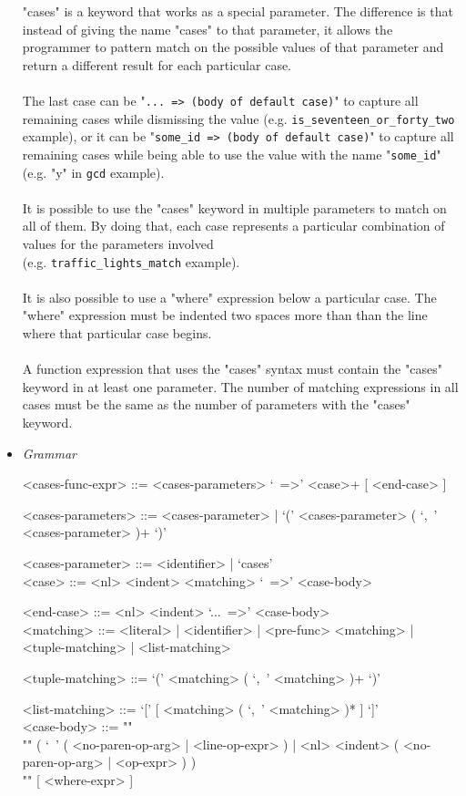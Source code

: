 \documentclass{article}
\begin{document}
\begin{itemize}
"cases" is a keyword that works as a special parameter. The difference is that
instead of giving the name "cases" to that parameter, it allows the programmer
to pattern match on the possible values of that parameter and return a
different result for each particular case. 
\\\\
The last case can be "\texttt{... => (body of default case)}" to capture all
remaining cases while dismissing the value (e.g.
\texttt{is_seventeen_or_forty_two} example), or it can be
"\texttt{some_id => (body of default case)}" to capture all remaining
cases while being able to use the value with the name "\texttt{some_id}"
(e.g.  "y" in \texttt{gcd} example).
\\\\
It is possible to use the "cases" keyword in multiple parameters to match on all
of them. By doing that, each case represents a particular combination of values
for the parameters involved\\(e.g. \texttt{traffic_lights_match} example).
\\\\
It is also possible to use a "where" expression below a particular case. The
"where" expression must be indented two spaces more than than the line where
that particular case begins.
\\\\
A function expression that uses the "cases" syntax must contain the "cases"
keyword in at least one parameter. The number of matching expressions in 
all cases must be the same as the number of parameters with the "cases" keyword.

\item \textit{Grammar}
\begin{grammar}
<cases-func-expr> ::= <cases-parameters> `\ =>' <case>+ [ <end-case> ]

<cases-parameters> ::=
<cases-parameter> | `(' <cases-parameter> ( `,\ ' <cases-parameter> )+ `)'

<cases-parameter> ::= <identifier> | `cases' \\

<case> ::=  <nl> <indent> <matching> `\ =>' <case-body>

<end-case> ::= <nl> <indent> `...\ =>' <case-body>\\

<matching> ::= 
<literal> | <identifier> | <pre-func> <matching> | <tuple-matching> |
<list-matching>

<tuple-matching> ::= `(' <matching> ( `,\ ' <matching> )+ `)'

<list-matching> ::= `[' [ <matching> ( `,\ ' <matching> )* ] `]' \\


<case-body> ::= ""\\""
( `\ ' ( <no-paren-op-arg> | <line-op-expr> ) |
<nl> <indent> ( <no-paren-op-arg> | <op-expr> ) ) \\""
[ <where-expr> ]
\end{grammar}

\end{itemize}
\end{document}
